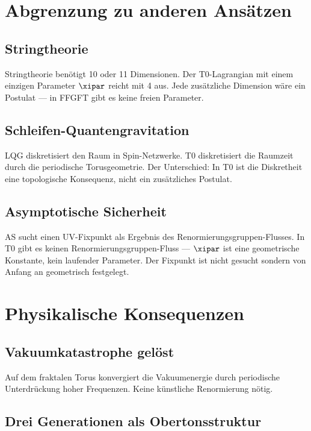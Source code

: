 \section{Abgrenzung zu anderen Ansätzen}

\subsection{Stringtheorie}

Stringtheorie benötigt 10 oder 11 Dimensionen. Der T0-Lagrangian mit einem einzigen Parameter $\xipar$ reicht mit 4 aus. Jede zusätzliche Dimension wäre ein Postulat — in FFGFT gibt es keine freien Parameter.

\subsection{Schleifen-Quantengravitation}

LQG diskretisiert den Raum in Spin-Netzwerke. T0 diskretisiert die Raumzeit durch die periodische Torusgeometrie. Der Unterschied: In T0 ist die Diskretheit eine topologische Konsequenz, nicht ein zusätzliches Postulat.

\subsection{Asymptotische Sicherheit}

AS sucht einen UV-Fixpunkt als Ergebnis des Renormierungsgruppen-Flusses. In T0 gibt es keinen Renormierungsgruppen-Fluss — $\xipar$ ist eine geometrische Konstante, kein laufender Parameter. Der Fixpunkt ist nicht gesucht sondern von Anfang an geometrisch festgelegt.

\section{Physikalische Konsequenzen}

\subsection{Vakuumkatastrophe gelöst}

Auf dem fraktalen Torus konvergiert die Vakuumenergie durch periodische Unterdrückung hoher Frequenzen. Keine künstliche Renormierung nötig.

\subsection{Drei Generationen als Obertonsstruktur}

